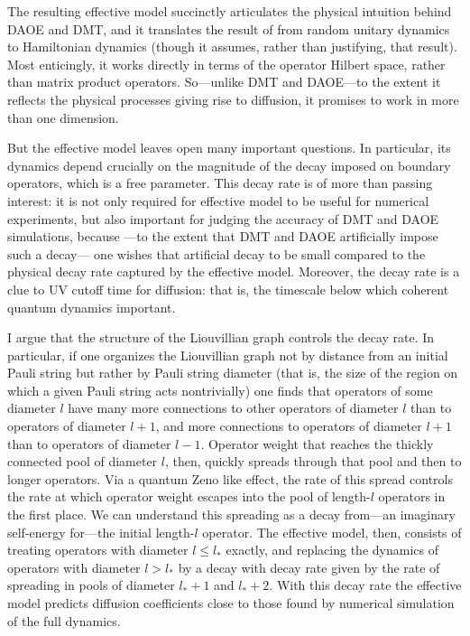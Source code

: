 \documentclass[aps,prb,nofootinbib,twocolumn,balancelastpage,amsmath,amssymb,floatfix,superscriptaddress,]{revtex4-1}
\begin{document}
The resulting effective model succinctly articulates the physical intuition behind DAOE and DMT,
and it translates the result of  from random unitary dynamics to Hamiltonian dynamics
(though it assumes, rather than justifying, that result).
Most enticingly,
it works directly in terms of the operator Hilbert space,
rather than matrix product operators.
So---unlike DMT and DAOE---to the extent it reflects the physical processes giving rise to diffusion,
it promises to work in more than one dimension.

But the effective model leaves open many important questions.
In particular, its dynamics depend crucially on the magnitude of the decay imposed on boundary operators,
which is a free parameter.
This decay rate is of more than passing interest:
it is not only required for effective model to be useful for numerical experiments,
but also important for judging the accuracy of DMT and DAOE simulations, because%
---to the extent that DMT and DAOE artificially impose such a decay---%
one wishes that artificial decay to be small compared to the physical decay rate captured by the effective model.
Moreover, the decay rate is a clue to UV cutoff time for diffusion:
that is, the timescale below which coherent quantum dynamics important.

I argue that the structure of the Liouvillian graph controls the decay rate.
In particular,
if one organizes the Liouvillian graph not by distance from an initial Pauli string
but rather by Pauli string diameter
(that is, the size of the region on which a given Pauli string acts nontrivially)
one finds that operators of some diameter $l$
have many more connections to other operators of diameter $l$
than to operators of diameter $l+1$,
and more connections to operators of diameter $l+1$
than to operators of diameter $l-1$.
Operator weight that reaches the thickly connected pool of diameter $l$, then,
quickly spreads through that pool
and then to longer operators.
Via a quantum Zeno like effect,
the rate of this spread controls
the rate at which operator weight escapes into the pool of length-$l$ operators in the first place.
We can understand this spreading as a decay from---an imaginary self-energy for---the initial length-$l$ operator.
The effective model, then,
consists of treating operators with diameter $l \le l_*$ exactly,
and replacing the dynamics of operators with diameter $l > l_*$ by a decay
with decay rate given by the rate of spreading in pools of diameter $l_*+1$ and $l_* + 2$.
With this decay rate the effective model predicts diffusion coefficients close to those found by numerical simulation of the full dynamics.
\end{document}
